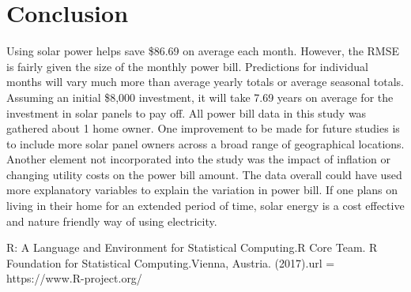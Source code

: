 \documentclass{svproc}
\begin{document}
\section{Conclusion}
Using solar power helps save \$86.69 on average each month. However, the RMSE is fairly given the size of the monthly power bill. Predictions for individual months will vary much more than average yearly totals or average seasonal totals. Assuming an initial \$8,000 investment, it will take 7.69 years on average for the investment in solar panels to pay off. All power bill data in this study was gathered about 1 home owner. One improvement to be made for future studies is to include more solar panel owners across a broad range of geographical locations. Another element not incorporated into the study was the impact of inflation or changing utility costs on the power bill amount. The data overall could have used more explanatory variables to explain the variation in power bill. If one plans on living in their home for an extended period of time, solar energy is a cost effective and nature friendly way of using electricity.

\newpage
\begin{thebibliography}{6}

R: A Language and Environment for Statistical Computing.R Core Team.
R Foundation for Statistical Computing.Vienna, Austria.
(2017).url = {https://www.R-project.org/}


\end{thebibliography}
\end{document}
